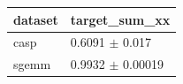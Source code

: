 \begin{tabular}{ll}
\toprule
dataset & target\_sum\_xx \\
\midrule
casp & 0.6091 $\pm$ 0.017 \\
sgemm & 0.9932 $\pm$ 0.00019 \\
\bottomrule
\end{tabular}
